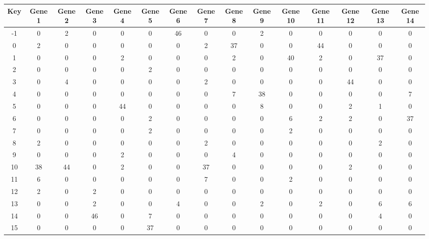 \begin{tabular}{|c|c|c|c|c|c|c|c|c|c|c|c|c|c|c|}
\hline
Key & Gene 1 & Gene 2 & Gene 3 & Gene 4 & Gene 5 & Gene 6 & Gene 7 & Gene 8 & Gene 9 & Gene 10 & Gene 11 & Gene 12 & Gene 13 & Gene 14 \\
\hline
-1 & 0 & 2 & 0 & 0 & 0 & 46 & 0 & 0 & 2 & 0 & 0 & 0 & 0 & 0 \\
0 & 2 & 0 & 0 & 0 & 0 & 0 & 2 & 37 & 0 & 0 & 44 & 0 & 0 & 0 \\
1 & 0 & 0 & 0 & 2 & 0 & 0 & 0 & 2 & 0 & 40 & 2 & 0 & 37 & 0 \\
2 & 0 & 0 & 0 & 0 & 2 & 0 & 0 & 0 & 0 & 0 & 0 & 0 & 0 & 0 \\
3 & 0 & 4 & 0 & 0 & 0 & 0 & 2 & 0 & 0 & 0 & 0 & 44 & 0 & 0 \\
4 & 0 & 0 & 0 & 0 & 0 & 0 & 0 & 7 & 38 & 0 & 0 & 0 & 0 & 7 \\
5 & 0 & 0 & 0 & 44 & 0 & 0 & 0 & 0 & 8 & 0 & 0 & 2 & 1 & 0 \\
6 & 0 & 0 & 0 & 0 & 2 & 0 & 0 & 0 & 0 & 6 & 2 & 2 & 0 & 37 \\
7 & 0 & 0 & 0 & 0 & 2 & 0 & 0 & 0 & 0 & 2 & 0 & 0 & 0 & 0 \\
8 & 2 & 0 & 0 & 0 & 0 & 0 & 2 & 0 & 0 & 0 & 0 & 0 & 2 & 0 \\
9 & 0 & 0 & 0 & 2 & 0 & 0 & 0 & 4 & 0 & 0 & 0 & 0 & 0 & 0 \\
10 & 38 & 44 & 0 & 2 & 0 & 0 & 37 & 0 & 0 & 0 & 0 & 2 & 0 & 0 \\
11 & 6 & 0 & 0 & 0 & 0 & 0 & 7 & 0 & 0 & 2 & 0 & 0 & 0 & 0 \\
12 & 2 & 0 & 2 & 0 & 0 & 0 & 0 & 0 & 0 & 0 & 0 & 0 & 0 & 0 \\
13 & 0 & 0 & 2 & 0 & 0 & 4 & 0 & 0 & 2 & 0 & 2 & 0 & 6 & 6 \\
14 & 0 & 0 & 46 & 0 & 7 & 0 & 0 & 0 & 0 & 0 & 0 & 0 & 4 & 0 \\
15 & 0 & 0 & 0 & 0 & 37 & 0 & 0 & 0 & 0 & 0 & 0 & 0 & 0 & 0 \\
\hline
\end{tabular}